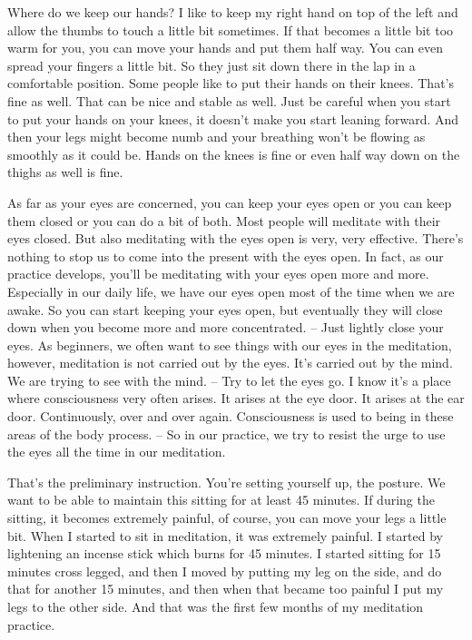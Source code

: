 \documentclass[letterpaper,10pt,english]{sphinxmanual}
\begin{document}
\sphinxAtStartPar
Where do we keep our hands? I like to keep my right hand on top of the
left and allow the thumbs to touch a little bit sometimes. If that becomes a
little bit too warm for you, you can move your hands and put them half way.
You can even spread your fingers a little bit. So they just sit down there in the
lap in a comfortable position. Some people like to put their hands on their
knees. That’s fine as well. That can be nice and stable as well. Just be careful
when you start to put your hands on your knees, it doesn’t make you start
leaning forward. And then your legs might become numb and your breathing
won’t be flowing as smoothly as it could be. Hands on the knees is fine or
even half way down on the thighs as well is fine.

\sphinxAtStartPar
As far as your eyes are concerned, you can keep your eyes open or you
can keep them closed or you can do a bit of both. Most people will meditate
with their eyes closed. But also meditating with the eyes open is very, very
effective. There’s nothing to stop us to come into the present with the eyes
open. In fact, as our practice develops, you’ll be meditating with your eyes
open  more  and  more.  Especially  in  our  daily  life,  we  have  our  eyes  open
most of the time when we are awake. So you can start keeping your eyes
open, but eventually they will close down when you become more and more
concentrated. – Just lightly close your eyes. As beginners, we often want to
see things with our eyes in the meditation, however, meditation is not carried
  out by the eyes. It’s carried out by the mind. We are trying to see with the
mind. – Try to let the eyes go. I know it’s a place where consciousness very
often arises. It arises at the eye door. It arises at the ear door. Continuously,
over  and  over  again.  Consciousness  is  used  to  being  in  these  areas  of  the
body process. – So in our practice, we try to resist the urge to use the eyes
all the time in our meditation.

\sphinxAtStartPar
That’s the preliminary instruction. You’re setting yourself up, the posture. We want to be able to maintain this sitting for at least 45 minutes. If
during  the  sitting,  it  becomes  extremely  painful,  of  course,  you  can  move
your legs a little bit. When I started to sit in meditation, it was extremely
painful. I started by lightening an incense stick which burns for 45 minutes.
I started  sitting for 15 minutes cross legged, and then I moved by putting
my leg on the side, and do that for another 15 minutes, and then when that
became too painful I put my legs to the other side. And that was the first few
months of my meditation practice.
\end{document}
